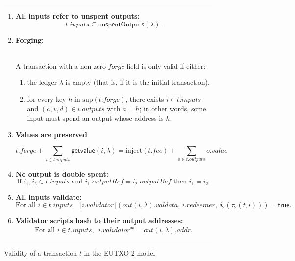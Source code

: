 \documentclass[a4paper]{article}
\newcommand\rfskip{7pt}
\newenvironment{ruledfigure}[1]{\begin{figure}[#1]\hrule\vspace{\rfskip}}{\vspace{\rfskip}\hrule\end{figure}}
\newcommand{\true}{\textsf{true}}
\newcommand{\support}{\ensuremath{\mathrm{sup}}}
\newcommand{\mi}[1]{\ensuremath{\mathit{#1}}}
\newcommand{\inputs}{\mi{inputs}}
\newcommand{\outputs}{\mi{outputs}}
\newcommand{\forge}{\mi{forge}}
\newcommand{\fee}{\mi{fee}}
\newcommand{\addr}{\mi{addr}}
\newcommand{\val}{\mi{value}}  %
\newcommand{\validator}{\mi{validator}}
\newcommand{\redeemer}{\mi{redeemer}}
\newcommand{\valdata}{\mi{valdata}}
\newcommand{\txout}{\mi{out}}
\newcommand{\getvalue}{\msf{getvalue}}
\newcommand{\msf}[1]{\ensuremath{\mathsf{#1}}}
\newcommand{\unspent}{\msf{unspentOutputs}}
\newcommand{\injectNative}{\ensuremath{\mathrm{inject}}}
\begin{document}
\begin{ruledfigure}{H}
  \begin{enumerate}
    \item \label{rule:all-inputs-refer-to-unspent-outputs-2} \textbf{All
      inputs refer to unspent outputs:}
      \[
        t.\inputs \subseteq \unspent(\lambda).
      \]
    \item\textbf{Forging:}\\\\
      \begin{minipage}{0.85\textwidth}
        A transaction with a non-zero \forge{} field is only
        valid if either:
        \begin{enumerate}
          \item the ledger $\lambda$ is empty (that is, if it is the initial transaction).
          \item \label{rule:custom-forge}
            for every key $h$ in $\support(t.\forge)$, there
            exists $i \in t.\inputs$ and $(a,v,d) \in i.\outputs$ with
            $a =h$; in other words, some input must spend an output
            whose address is $h$.
        \end{enumerate}
      \end{minipage}
    \item \textbf{Values are preserved}\\
      \begin{minipage}{0.85\textwidth}
          \label{rule:value-is-preserved-2}
            \[
            t.\forge + \sum_{i \in t.\inputs} \getvalue(i, \lambda) = \injectNative(t.\fee) + \sum_{o \in t.\outputs} o.\val
            \]
      \end{minipage}
    \item \label{rule:no-double-spending-2} \textbf{No output is double spent:}
    \[
     \textrm{If } i_1, i_2 \in t.\inputs \textrm{ and }  i_1.\mathit{outputRef} = i_2.\mathit{outputRef}
     \textrm{ then } i_1 = i_2.
    \]
    \item\label{rule:all-inputs-validate-2} \textbf{All inputs validate:}
    \[
    \textrm{For all } i \in t.\inputs,\enspace \llbracket
    i.\validator\rrbracket(\txout(i,\lambda).\valdata,\, i.\redeemer,\, \delta_2(\tau_2(t, i))) = \true.
      \]
    \item\label{rule:validator-scripts-hash-2} \textbf{Validator scripts hash to their output addresses:}
    \[
      \textrm{For all } i \in t.\inputs,\enspace i.\validator^{\#} = \txout(i, \lambda).\addr.
    \]
  \end{enumerate}
  \caption{Validity of a transaction $t$ in the EUTXO-2 model}
  \label{fig:eutxo-2-validity}

\end{ruledfigure}
\end{document}
